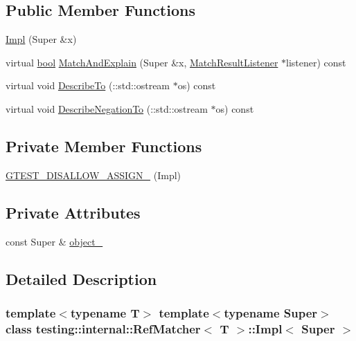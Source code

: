 \subsection*{Public Member Functions}
\begin{DoxyCompactItemize}
\item 
\hyperlink{classtesting_1_1internal_1_1RefMatcher_3_01T_01_6_01_4_1_1Impl_a9286bcbdec6e5b497bc7b60cd2983c75}{Impl} (Super \&x)
\item 
virtual \hyperlink{classbool}{bool} \hyperlink{classtesting_1_1internal_1_1RefMatcher_3_01T_01_6_01_4_1_1Impl_ab10f996ea80e601e763c624edd6890d5}{Match\+And\+Explain} (Super \&x, \hyperlink{classtesting_1_1MatchResultListener}{Match\+Result\+Listener} $\ast$listener) const
\item 
virtual void \hyperlink{classtesting_1_1internal_1_1RefMatcher_3_01T_01_6_01_4_1_1Impl_a3ddb19a24bfbb627a9c6194b665cbd19}{Describe\+To} (\+::std\+::ostream $\ast$os) const
\item 
virtual void \hyperlink{classtesting_1_1internal_1_1RefMatcher_3_01T_01_6_01_4_1_1Impl_aa9ee30325e568c5599dd76f8823bf876}{Describe\+Negation\+To} (\+::std\+::ostream $\ast$os) const
\end{DoxyCompactItemize}
\subsection*{Private Member Functions}
\begin{DoxyCompactItemize}
\item 
\hyperlink{classtesting_1_1internal_1_1RefMatcher_3_01T_01_6_01_4_1_1Impl_a831ab31b47e451eaa81ad5887db94562}{G\+T\+E\+S\+T\+\_\+\+D\+I\+S\+A\+L\+L\+O\+W\+\_\+\+A\+S\+S\+I\+G\+N\+\_\+} (Impl)
\end{DoxyCompactItemize}
\subsection*{Private Attributes}
\begin{DoxyCompactItemize}
\item 
const Super \& \hyperlink{classtesting_1_1internal_1_1RefMatcher_3_01T_01_6_01_4_1_1Impl_a534fb65e97f9b601460eb8b0ad09074e}{object\+\_\+}
\end{DoxyCompactItemize}


\subsection{Detailed Description}
\subsubsection*{template$<$typename T$>$\newline
template$<$typename Super$>$\newline
class testing\+::internal\+::\+Ref\+Matcher$<$ T $>$\+::\+Impl$<$ Super $>$}



